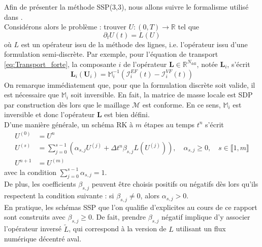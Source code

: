 \documentclass[11pt, a4paper, oneside]{report}
\begin{document}
\begin{samepage}
\enlargethispage{2\baselineskip}
Afin de présenter la méthode SSP(3,3), nous allons suivre le formalisme utilisé dans \cite{gottlieb2005high}. \\
Considérons alors le problème : trouver $U : (0, T) \longrightarrow \mathbb{R}$ tel que
\begin{equation} \label{eq:Gottlieb}
    \partial_t U(t) = L(U)
\end{equation}
où $L$ est un opérateur issu de la méthode des lignes, i.e. l'opérateur issu d'une formulation semi-discrète. Par exemple, pour l'équation de transport \eqref{eq:Transport_forte}, la composante $i$ de l'opérateur $\bm{L} \in \mathbb{R}^{N_\text{ddl}}$, notée $\bm{L}_i$, s'écrit
\begin{equation}
    \bm{L}_i(\bm{U}_i) = \mathbb{M}_i^{-1} \left( \bm{\mathcal{I}}_i^{EF}(t) - \bm{\mathcal{I}}_i^{VF}(t) \right)
\end{equation}
On remarque immédiatement que, pour que la formulation discrète soit valide, il est nécessaire que $\mathbb{M}_i$ soit inversible. En fait, la matrice de masse locale est SDP par construction dès lors que le maillage $\mathcal{M}$ est conforme. En ce sens, $\mathbb{M}_i$ est inversible et donc l'opérateur $\bm{L}$ est bien défini. \\

D'une manière générale, un schéma RK à $m$ étapes au temps $t^n$ s'écrit
\begin{equation} \label{eq:RK_Shu_Osher}
    \begin{aligned}
        U^{(0)} & = U^n \\
        U^{(s)} & = \sum_{j = 0}^{s-1} \left( \alpha_{s, j} U^{(j)} + \Delta t^n \beta_{s, j} L \left( U^{(j)} \right) \right), \quad \alpha_{s, j} \geq 0, \quad s \in \llbracket 1, m \rrbracket \\
        U^{n+1} & = U^{(m)}
    \end{aligned} 
\end{equation}
avec la condition $\sum_{j = 0}^{s-1} \alpha_{s, j} = 1$. \\
De plus, les coefficients $\beta_{s, j}$ peuvent être choisis positifs ou négatifs dès lors qu'ils respectent la condition suivante : si $\beta_{s, j} \neq 0$, alors $\alpha_{s, j} > 0$. \\
En pratique, les schémas SSP que l'on qualifie d'explicites au cours de ce rapport sont construits avec $\beta_{s, j} \geq 0$. De fait, prendre $\beta_{s, j}$ négatif implique d'y associer l'opérateur inversé $\widetilde{L}$, qui correspond à la version de $L$ utilisant un flux numérique décentré aval.


\end{samepage}
\end{document}
